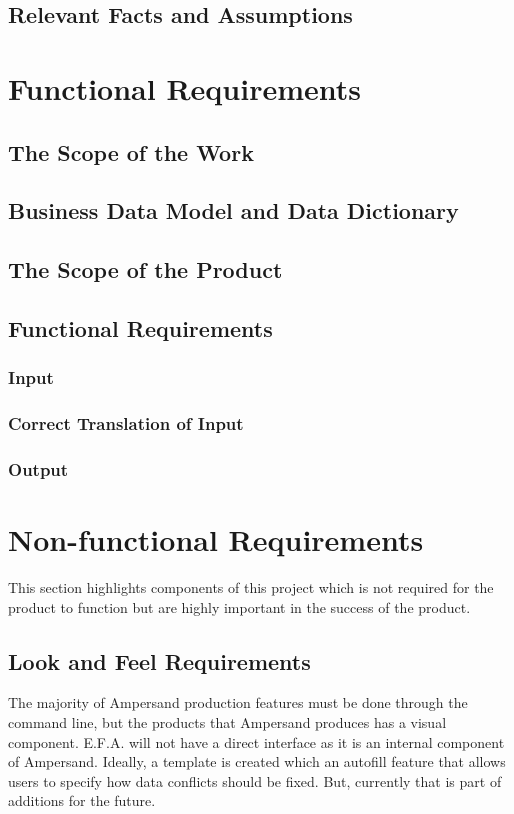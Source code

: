\documentclass[12pt]{report}
\begin{document}
\section{Relevant Facts and Assumptions}\label{sec:Assumptions}

\chapter{Functional Requirements}\label{ch:Functional}
\section{The Scope of the Work}\label{sec:ScopeOfWork}
\section{Business Data Model and Data Dictionary}\label{sec:DataModel}
\section{The Scope of the Product}\label{sec:ScopeOfProduct}
\section{Functional Requirements}\label{sec:Functional}
\subsection{Input}
\subsection{Correct Translation of Input}
\subsection{Output}

\chapter{Non-functional Requirements}\label{ch:NonFunc}
This section highlights components of this project which is not required for 
the product to function but are highly important in the success of the product. 
\section{Look and Feel Requirements}\label{sec:LookAndFeel} 
The majority of Ampersand production features must be done through the command 
line, but the products that Ampersand produces has a visual component. E.F.A. 
will not have a direct interface as it is an internal component of Ampersand. 
Ideally, a template is created which an autofill feature that allows users to 
specify how data conflicts should be fixed. But, currently that is part of 
additions for the future. 
\end{document}
